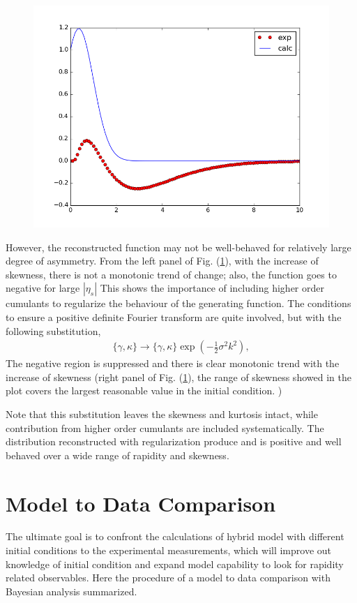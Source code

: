 \documentclass[aps,prl,twocolumn,groupedaddress]{revtex4-1}
\begin{document}
	\begin{figure}\label{regulation}
	\includegraphics[width=\columnwidth]{pics/place_holder.png}
	\end{figure}
 
	However, the reconstructed function may not be well-behaved for relatively large degree of asymmetry. 
	From the left panel of Fig. (\ref{regulation}), with the increase of skewness, there is not a monotonic trend of change; also, the function goes to negative for large $|\eta_s|$
	This shows the importance of including higher order cumulants to regularize the behaviour of the generating function. 
	The conditions to ensure a positive definite Fourier transform are quite involved, but with the following substitution,
	\begin{eqnarray}
		\{\gamma, \kappa\} \rightarrow \{\gamma, \kappa\} \exp\left(-\frac{1}{2}\sigma^2k^2\right),
	\end{eqnarray}
	The negative region is suppressed and there is clear monotonic trend with the increase of skewness (right panel of Fig. (\ref{regulation}), the range of skewness showed in the plot covers the largest reasonable value in the initial condition. )
		
	Note that this substitution leaves the skewness and kurtosis intact, while contribution from higher order cumulants are included systematically.
	The distribution reconstructed with regularization produce and is positive and well behaved over a wide range of rapidity and skewness.

\section{Model to Data Comparison}
	The ultimate goal is to confront the calculations of hybrid model with different initial conditions to the experimental measurements, which will improve out knowledge of initial condition and expand model capability to look for rapidity related observables.
	Here the procedure of a model to data comparison with Bayesian analysis summarized. 
\end{document}
